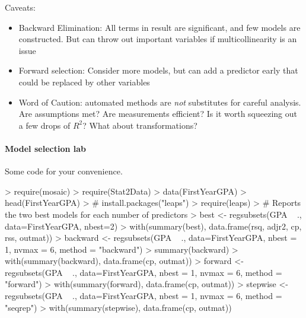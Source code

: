 \documentclass[10pt]{article}
\begin{document}
Caveats:
\begin{itemize}
\item Backward Elimination: All terms in result are significant, and few models are constructed. But can throw out important variables if multicollinearity is an issue
\item Forward selection: Consider more models, but can add a predictor early that could be replaced by other variables
\item Word of Caution: automated methods are \emph{not} substitutes for careful analysis. Are assumptions met? Are measurements efficient? Is it worth squeezing out a few drops of $R^2$? What about transformations?
\end{itemize}

\paragraph{Model selection lab}
Some code for your convenience. 

\begin{Schunk}
\begin{Sinput}
> require(mosaic)
> require(Stat2Data)
> data(FirstYearGPA)
> head(FirstYearGPA)
> # install.packages("leaps")
> require(leaps)
> # Reports the two best models for each number of predictors
> best <- regsubsets(GPA ~ ., data=FirstYearGPA, nbest=2)
> with(summary(best), data.frame(rsq, adjr2, cp, rss, outmat))
> backward <- regsubsets(GPA ~ ., data=FirstYearGPA, nbest = 1, nvmax = 6, method = "backward")
> summary(backward)
> with(summary(backward), data.frame(cp, outmat))
> forward <- regsubsets(GPA ~ ., data=FirstYearGPA, nbest = 1, nvmax = 6, method = "forward")
> with(summary(forward), data.frame(cp, outmat))
> stepwise <- regsubsets(GPA ~ ., data=FirstYearGPA, nbest = 1, nvmax = 6, method = "seqrep")
> with(summary(stepwise), data.frame(cp, outmat))
\end{Sinput}
\end{Schunk}
\end{document}
